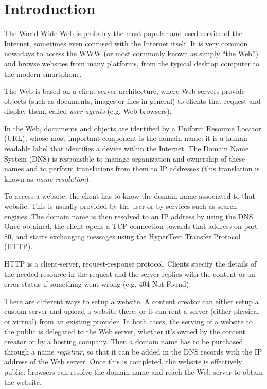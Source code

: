 \documentclass[mscthesis]{usiinfthesis}
\begin{document}
\tableofcontents

\mainmatter

\chapter{Introduction}\label{ch:intro}

The World Wide Web is probably the most popular and used service of the Internet, sometimes even confused with the Internet itself. It is very common nowadays to access the WWW (or most commonly known as simply ``the Web'') and browse websites from many platforms, from the typical desktop computer to the modern smartphone.


The Web is based on a client-server architecture, where Web servers provide objects (such as documents, images or files in general) to clients that request and display them, called \textit{user agents} (e.g. Web browsers).

In the Web, documents and objects are identified by a Uniform Resource Locator (URL), whose most important component is the domain name: it is a human-readable label that identifies a device within the Internet. The Domain Name System (DNS) is responsible to manage organization and ownership of these names and to perform translations from them to IP addresses (this translation is known as \emph{name resolution}).

To access a website, the client has to know the domain name associated to that website. This is usually provided by the user or by services such as search engines. The domain name is then resolved to an IP address by using the DNS. Once obtained, the client opens a TCP connection towards that address on port 80, and starts exchanging messages using the HyperText Transfer Protocol (HTTP).

HTTP is a client-server, request-response protocol. Clients specify the details of the needed resource in the request and the server replies with the content or an error status if something went wrong (e.g. 404 Not Found). %

There are different ways to setup a website. A content creator can either setup a custom server and upload a website there, or it can rent a server (either physical or virtual) from an existing provider. In both cases, the serving of a website to the public is delegated to the Web server, whether it's owned by the content creator or by a hosting company. Then a domain name has to be purchased through a name \emph{registrar}, so that it can be added in the DNS records with the IP address of the Web server. Once this is completed, the website is effectively public: browsers can resolve the domain name and reach the Web server to obtain the website.
\end{document}
